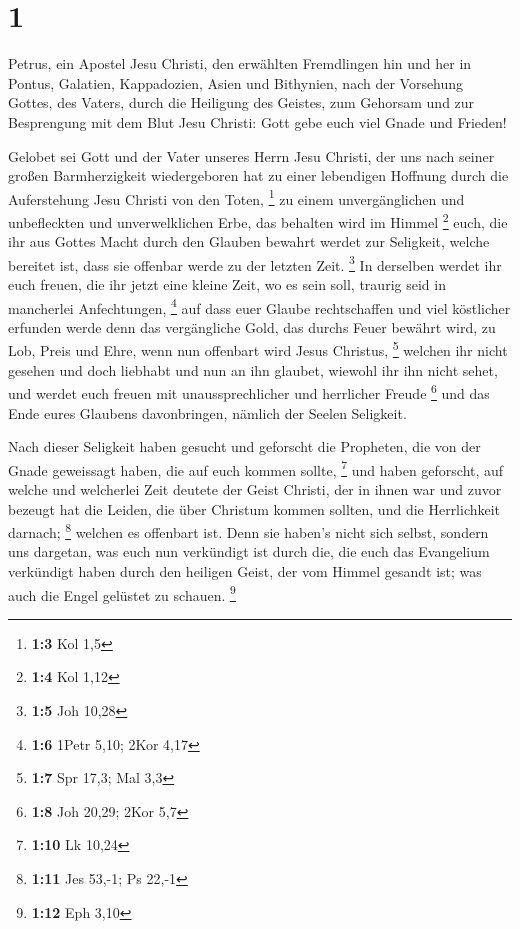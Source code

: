 \hypertarget{section}{%
\section{1}\label{section}}

 Petrus, ein Apostel Jesu Christi, den erwählten
Fremdlingen hin und her in Pontus, Galatien, Kappadozien, Asien und
Bithynien,  nach der Vorsehung Gottes, des Vaters, durch
die Heiligung des Geistes, zum Gehorsam und zur Besprengung mit dem Blut
Jesu Christi: Gott gebe euch viel Gnade und Frieden!

 Gelobet sei Gott und der Vater unseres Herrn Jesu
Christi, der uns nach seiner großen Barmherzigkeit wiedergeboren hat zu
einer lebendigen Hoffnung durch die Auferstehung Jesu Christi von den
Toten, \footnote{\textbf{1:3} Kol 1,5}  zu einem
unvergänglichen und unbefleckten und unverwelklichen Erbe, das behalten
wird im Himmel \footnote{\textbf{1:4} Kol 1,12}  euch, die
ihr aus Gottes Macht durch den Glauben bewahrt werdet zur Seligkeit,
welche bereitet ist, dass sie offenbar werde zu der letzten Zeit.
\footnote{\textbf{1:5} Joh 10,28}  In derselben werdet ihr
euch freuen, die ihr jetzt eine kleine Zeit, wo es sein soll, traurig
seid in mancherlei Anfechtungen, \footnote{\textbf{1:6} 1Petr 5,10; 2Kor
  4,17}  auf dass euer Glaube rechtschaffen und viel
köstlicher erfunden werde denn das vergängliche Gold, das durchs Feuer
bewährt wird, zu Lob, Preis und Ehre, wenn nun offenbart wird Jesus
Christus, \footnote{\textbf{1:7} Spr 17,3; Mal 3,3} 
welchen ihr nicht gesehen und doch liebhabt und nun an ihn glaubet,
wiewohl ihr ihn nicht sehet, und werdet euch freuen mit
unaussprechlicher und herrlicher Freude \footnote{\textbf{1:8} Joh
  20,29; 2Kor 5,7}  und das Ende eures Glaubens
davonbringen, nämlich der Seelen Seligkeit.

 Nach dieser Seligkeit haben gesucht und geforscht die
Propheten, die von der Gnade geweissagt haben, die auf euch kommen
sollte, \footnote{\textbf{1:10} Lk 10,24}  und haben
geforscht, auf welche und welcherlei Zeit deutete der Geist Christi, der
in ihnen war und zuvor bezeugt hat die Leiden, die über Christum kommen
sollten, und die Herrlichkeit darnach; \footnote{\textbf{1:11} Jes
  53,-1; Ps 22,-1}  welchen es offenbart ist. Denn sie
haben's nicht sich selbst, sondern uns dargetan, was euch nun verkündigt
ist durch die, die euch das Evangelium verkündigt haben durch den
heiligen Geist, der vom Himmel gesandt ist; was auch die Engel gelüstet
zu schauen. \footnote{\textbf{1:12} Eph 3,10}

